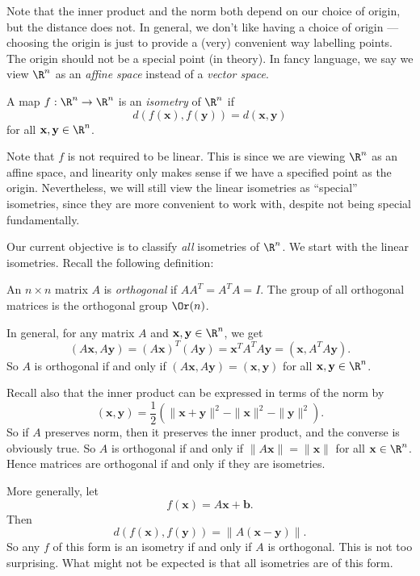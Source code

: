 \documentclass[a4paper]{article}
\begin{document}
Note that the inner product and the norm both depend on our choice of origin, but the distance does not. In general, we don't like having a choice of origin --- choosing the origin is just to provide a (very) convenient way labelling points. The origin should not be a special point (in theory). In fancy language, we say we view $\R^n$ as an \emph{affine space} instead of a \emph{vector space}.

\begin{defi}[Isometry]
  A map $f: \R^n \to \R^n$ is an \emph{isometry} of $\R^n$ if
  \[
    d(f(\mathbf{x}), f(\mathbf{y})) = d(\mathbf{x}, \mathbf{y})
  \]
  for all $\mathbf{x}, \mathbf{y} \in \R^n$.
\end{defi}
Note that $f$ is not required to be linear. This is since we are viewing $\R^n$ as an affine space, and linearity only makes sense if we have a specified point as the origin. Nevertheless, we will still view the linear isometries as ``special'' isometries, since they are more convenient to work with, despite not being special fundamentally.

Our current objective is to classify \emph{all} isometries of $\R^n$. We start with the linear isometries. Recall the following definition:
\begin{defi}
  An $n \times n$ matrix $A$ is \emph{orthogonal} if $AA^T = A^T A = I$. The group of all orthogonal matrices is the orthogonal group $\Or(n)$.
\end{defi}

In general, for any matrix $A$ and $\mathbf{x}, \mathbf{y} \in \R^n$, we get
\[
  (A\mathbf{x}, A \mathbf{y}) = (A\mathbf{x})^T (A \mathbf{y}) = \mathbf{x}^T A^T A \mathbf{y} = (\mathbf{x}, A^T A \mathbf{y}).
\]
So $A$ is orthogonal if and only if $(A\mathbf{x}, A\mathbf{y}) = (\mathbf{x}, \mathbf{y})$ for all $\mathbf{x}, \mathbf{y} \in \R^n$.

Recall also that the inner product can be expressed in terms of the norm by
\[
  (\mathbf{x}, \mathbf{y}) = \frac{1}{2}(\|\mathbf{x} + \mathbf{y}\|^2 - \|\mathbf{x}\|^2 -\|\mathbf{y}\|^2).
\]
So if $A$ preserves norm, then it preserves the inner product, and the converse is obviously true. So $A$ is orthogonal if and only if $\|A\mathbf{x}\| = \|\mathbf{x}\|$ for all $\mathbf{x} \in \R^n$. Hence matrices are orthogonal if and only if they are isometries.

More generally, let
\[
  f(\mathbf{x}) = A\mathbf{x} + \mathbf{b}.
\]
Then
\[
  d(f(\mathbf{x}), f(\mathbf{y})) = \|A(\mathbf{x} - \mathbf{y})\|.
\]
So any $f$ of this form is an isometry if and only if $A$ is orthogonal. This is not too surprising. What might not be expected is that all isometries are of this form.
\end{document}
